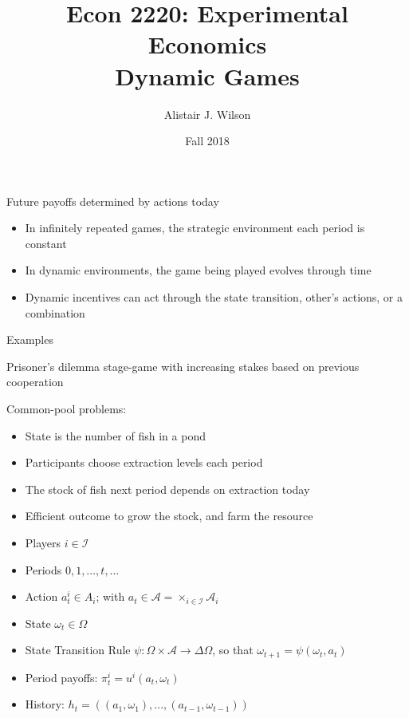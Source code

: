 \documentclass{beamer}
\title{\LARGE Econ 2220: Experimental Economics \\ Dynamic Games}
\author{Alistair J. Wilson }
\date{Fall 2018}
\begin{document}
\maketitle


\begin{frame}{Future payoffs determined by actions today}
\begin{card}
    \begin{itemize}
    \item In infinitely repeated games, the strategic environment each period
    is constant
    \item In dynamic environments, the game being played evolves through time
    \item Dynamic incentives can act through the state transition,  other's actions, or a combination
    \end{itemize}
\end{card}
\end{frame}

\begin{frame}{Examples}
\begin{card}
 Prisoner's dilemma stage-game with increasing stakes based on previous cooperation
\end{card}
\begin{card}
Common-pool problems:
    \begin{itemize}
    \item State is the number of fish in a pond
    \item Participants choose extraction levels each period
    \item The stock of fish next period depends on extraction today
    \item Efficient outcome to grow the stock, and farm the resource
    \end{itemize}
\end{card}
\end{frame}

\begin{frame}
\begin{card}
\begin{itemize}
    \item Players $i\in\mathcal{I}$
    \item Periods $0,1,\ldots,t,\ldots$
    \item Action $a_{t}^{i}\in A_{i}$; with $a_t\in\mathcal{A}=\times_{i\in\mathcal{I}}\mathcal{A}_{i}$
    \item State $\omega_{t}\in\Omega$
    \item State Transition Rule $\psi:\Omega\times\mathcal{A}\rightarrow\Delta\Omega$,
   so that $\omega_{t+1}=\psi(\omega_{t},a_{t})$
    \item Period payoffs: $\pi_{t}^{i}=u^{i}(a_{t},\omega_{t})$
    \item History: $h_{t}=\left((a_{1},\omega_{1}),...,(a_{t-1},\omega_{t-1})\right)$
\end{itemize}
\end{card}
\end{frame}
\end{document}
